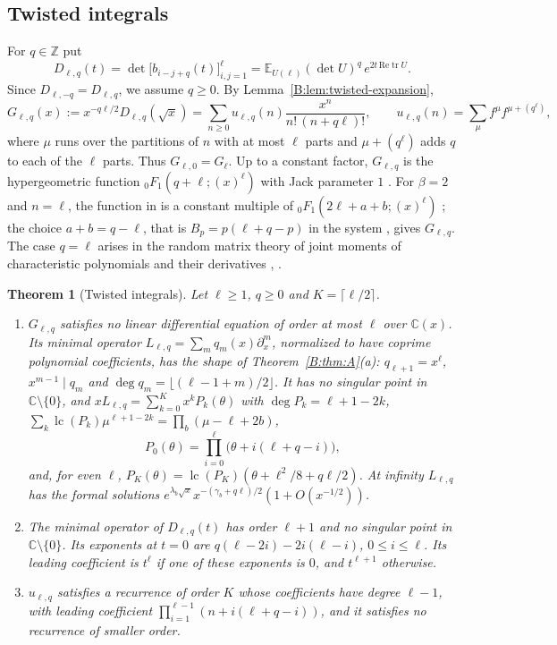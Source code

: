 \documentclass[11pt,a4paper]{article}
\newtheorem{theorem}{Theorem}[section]
\theoremstyle{definition}
\theoremstyle{remark}
\newcommand{\C}{\mathbb C}
\newcommand{\Z}{\mathbb Z}
\newcommand{\E}{\mathbb E}
\newcommand{\fl}[1]{\lfloor #1\rfloor}
\newcommand{\cl}[1]{\lceil #1\rceil}
\DeclareMathOperator{\lc}{lc}
\DeclareMathOperator{\tr}{tr}
\numberwithin{equation}{section}
\begin{document}
\subsection*{Twisted integrals}
For $q\in\Z$ put
\[
D_{\ell,q}(t)=\det\bigl[b_{i-j+q}(t)\bigr]_{i,j=1}^{\ell}=\E_{U(\ell)}(\det U)^q\,e^{2t\,\mathrm{Re}\tr U}.
\]
Since $D_{\ell,-q}=D_{\ell,q}$, we assume $q\ge0$. By Lemma~\ref{B:lem:twisted-expansion},
\[
G_{\ell,q}(x):=x^{-q\ell/2}D_{\ell,q}(\sqrt x)=\sum_{n\ge0}u_{\ell,q}(n)\frac{x^n}{n!\,(n+q\ell)!},\qquad u_{\ell,q}(n)=\sum_{\mu}f^{\mu}f^{\mu+(q^\ell)},
\]
where $\mu$ runs over the partitions of $n$ with at most $\ell$ parts and $\mu+(q^\ell)$ adds $q$ to each of the $\ell$ parts. Thus $G_{\ell,0}=G_\ell$. Up to a constant factor, $G_{\ell,q}$ is the hypergeometric function ${}_0F_1(q+\ell;(x)^\ell)$ with Jack parameter $1$ \cite[(2.4), (2.5)]{FW26}. For $\beta=2$ and $n=\ell$, the function in \cite[Prop.~4.1]{FW26} is a constant multiple of ${}_0F_1(2\ell+a+b;(x)^\ell)$ \cite[(3.10) and Rem.~3.4]{FW26}; the choice $a+b=q-\ell$, that is $B_p=p(\ell+q-p)$ in the system \cite[(3.6)]{FW26}, gives $G_{\ell,q}$. The case $q=\ell$ arises in the random matrix theory of joint moments of characteristic polynomials and their derivatives \cite{KW23}, \cite[\S4.3]{FW26}.

\begin{theorem}[Twisted integrals]\label{B:thm:twisted}
Let $\ell\ge1$, $q\ge0$ and $K=\cl{\ell/2}$.
\begin{enumerate}
\item[(a)] $G_{\ell,q}$ satisfies no linear differential equation of order at most $\ell$ over $\C(x)$. Its minimal operator $L_{\ell,q}=\sum_mq_m(x)\partial_x^m$, normalized to have coprime polynomial coefficients, has the shape of Theorem~\ref{B:thm:A}(a): $q_{\ell+1}=x^\ell$, $x^{m-1}\mid q_m$ and $\deg q_m=\fl{(\ell-1+m)/2}$. It has no singular point in $\C\setminus\{0\}$, and $xL_{\ell,q}=\sum_{k=0}^{K}x^kP_k(\theta)$ with $\deg P_k=\ell+1-2k$, $\sum_k\lc(P_k)\mu^{\ell+1-2k}=\prod_b(\mu-\ell+2b)$,
\[
P_0(\theta)=\prod_{i=0}^{\ell}\bigl(\theta+i(\ell+q-i)\bigr),
\]
and, for even $\ell$, $P_K(\theta)=\lc(P_K)(\theta+\ell^2/8+q\ell/2)$. At infinity $L_{\ell,q}$ has the formal solutions $e^{\lambda_b\sqrt x}x^{-(\gamma_b+q\ell)/2}(1+O(x^{-1/2}))$.
\item[(b)] The minimal operator of $D_{\ell,q}(t)$ has order $\ell+1$ and no singular point in $\C\setminus\{0\}$. Its exponents at $t=0$ are $q(\ell-2i)-2i(\ell-i)$, $0\le i\le\ell$. Its leading coefficient is $t^\ell$ if one of these exponents is $0$, and $t^{\ell+1}$ otherwise.
\item[(c)] $u_{\ell,q}$ satisfies a recurrence of order $K$ whose coefficients have degree $\ell-1$, with leading coefficient $\prod_{i=1}^{\ell-1}(n+i(\ell+q-i))$, and it satisfies no recurrence of smaller order.
\end{enumerate}
\end{theorem}
\end{document}
